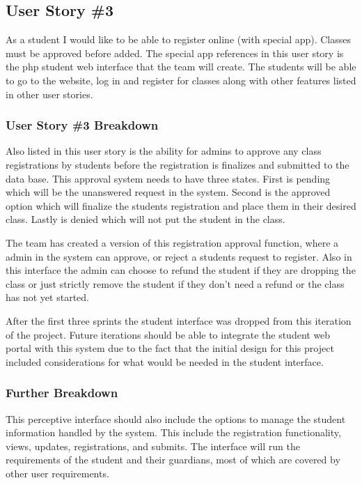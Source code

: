 \subsection{User Story \#3} 
As a student I would like to be able to register online (with special app). Classes must be approved before added. The special app references in this user story is the php student web interface that the team will create. The students will be able to go to the website, log in and register for classes along with other features listed in other user stories.

\subsubsection{User Story \#3 Breakdown}
Also listed in this user story is the ability for admins to approve any class registrations by students before the registration is finalizes and submitted to the data base. This approval system needs to have three states. First is pending which will be the unanswered request in the system. Second is the approved option which will finalize the students registration and place them in their desired class. Lastly is denied which will not put the student in the class.

The team has created a version of this registration approval function, where a admin in the system can approve, or reject a students request to register. Also in this interface the admin can choose to refund the student if they are dropping the class or just strictly remove the student if they don't need a refund or the class has not yet started.

After the first three sprints the student interface was dropped from this iteration of the project. Future iterations should be able to integrate the student web portal with this system due to the fact that the initial design for this project included considerations for what would be needed in the student interface.

\subsubsection{Further Breakdown}
This perceptive interface should also include the options to manage the student information handled by the system. This include the registration functionality, views, updates, registrations, and submits. The interface will run the requirements of the student and their guardians, most of which are covered by other user requirements.

